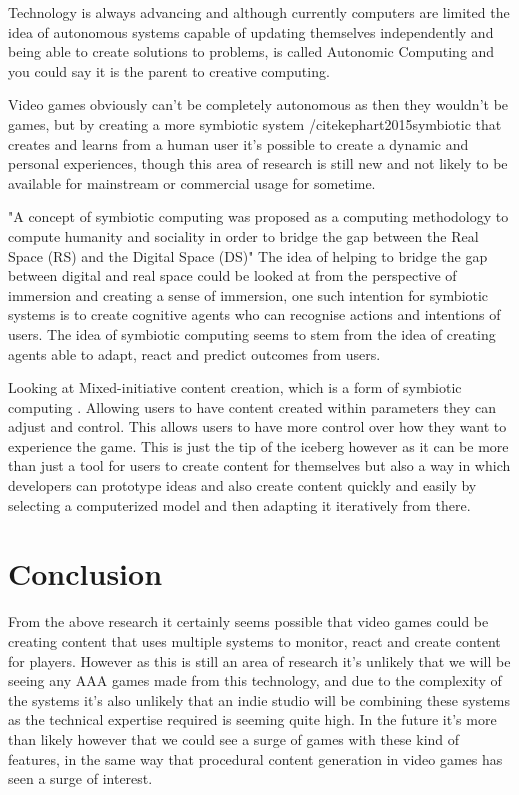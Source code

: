 \documentclass{scrartcl}
\begin{document}
Technology is always advancing and although currently computers are limited the idea of autonomous systems capable of updating themselves independently and being able to create solutions to problems, is called Autonomic Computing \cite{viroli2016combining} \cite{capodieci2013designing} \cite{krupitzer2015towards} and you could say it is the parent to creative computing. 

Video games obviously can't be completely autonomous as then they wouldn't be games, but by creating a more symbiotic system /cite{kephart2015symbiotic} that creates and learns from a human user it's possible to create a dynamic and personal experiences, though this area of research is still new and not likely to be available for mainstream or commercial usage for sometime. 

"A concept of symbiotic computing was proposed as a computing methodology to compute humanity and sociality in order to bridge the gap between the Real Space (RS) and the Digital Space (DS)" \cite{sugawara2008design} The idea of helping to bridge the gap between digital and real space could be looked at from the perspective of immersion and creating a sense of immersion, one such intention for symbiotic systems is to create cognitive agents who can recognise actions and intentions of users. The idea of symbiotic computing seems to stem from the idea of creating agents able to adapt, react and predict outcomes from users. 

Looking at Mixed-initiative content creation, which is a form of symbiotic computing \cite{liapis2016mixed} \cite{yannakakis2014mixed}. Allowing users to have content created within parameters they can adjust and control. This allows users to have more control over how they want to experience the game. This is just the tip of the iceberg however as it can be more than just a tool for users to create content for themselves but also a way in which developers can prototype ideas and also create content quickly and easily by selecting a computerized model and then adapting it iteratively from there.

\section{Conclusion}

From the above research it certainly seems possible that video games could be creating content that uses multiple systems to monitor, react and create content for players. However  as this is still an area of research it's unlikely that we will be seeing any AAA games made from this technology, and due to the complexity of the systems it's also unlikely that an indie studio will be combining these systems as the technical expertise required is seeming quite high. In the future it's more than likely however that we could see a surge of games with these kind of features, in the same way that procedural content generation in video games has seen a surge of interest. 





\end{document}
